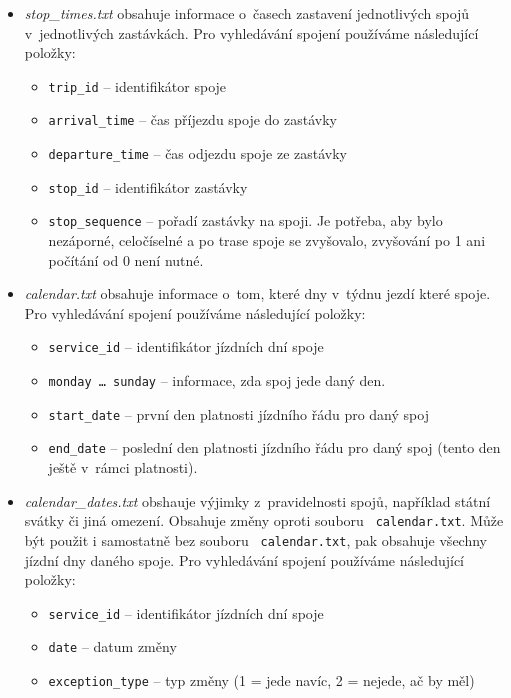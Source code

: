 \begin{itemize}
\begin{itemize}
\end{itemize}
\item {\em stop\_times.txt} obsahuje informace o~časech zastavení jednotlivých
spojů v~jednotlivých zastávkách. Pro vyhledávání spojení používáme následující
položky:
\begin{itemize}
	\item {\tt trip\_id} -- identifikátor spoje
	\item {\tt arrival\_time} -- čas příjezdu spoje do zastávky 
	\item {\tt departure\_time} -- čas odjezdu spoje ze zastávky
	\item {\tt stop\_id} -- identifikátor zastávky
	\item {\tt stop\_sequence} -- pořadí zastávky na spoji. Je potřeba, aby
	bylo nezáporné, celočíselné a po trase spoje se zvyšovalo, zvyšování po
	1 ani počítání od 0 není nutné.
\end{itemize}
\item {\em calendar.txt} obsahuje informace o~tom, které dny v~týdnu jezdí které
spoje. Pro vyhledávání spojení používáme následující položky:
\begin{itemize}
	\item {\tt service\_id} -- identifikátor jízdních dní spoje
	\item {\tt monday \dots{} sunday} -- informace, zda spoj jede daný den. 
	\item {\tt start\_date} -- první den platnosti jízdního řádu pro daný
	spoj
	\item {\tt end\_date} -- poslední den platnosti jízdního řádu pro daný
	spoj (tento den ještě v~rámci platnosti).
\end{itemize}
\item {\em calendar\_dates.txt} obshauje výjimky z~pravidelnosti spojů,
například státní svátky či jiná omezení. Obsahuje změny oproti souboru {\tt
calendar.txt}. Může být použit i samostatně bez souboru {\tt
calendar.txt}, pak obsahuje všechny jízdní dny daného spoje. Pro vyhledávání
spojení používáme následující položky:
\begin{itemize}
	\item {\tt service\_id} -- identifikátor jízdních dní spoje 
	\item {\tt date} -- datum změny
	\item {\tt exception\_type} -- typ změny (1 = jede navíc, 2 = nejede, ač
	by měl)
\end{itemize}
\end{itemize}

